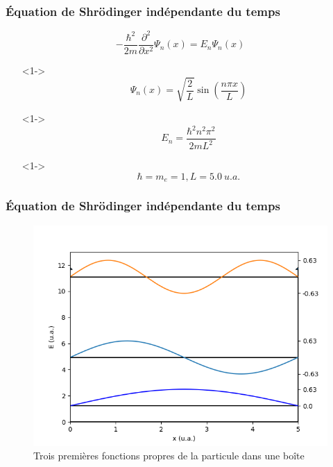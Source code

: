 \documentclass[aspectratio=169]{beamer}
\begin{document}
\begin{frame}
\frametitle{Équation de Shrödinger indépendante du temps}


\begin{equation}\tag{4}
-\frac{\hbar^2}{2m}\frac{\partial^2}{\partial x^2}\Psi_n(x)=E_n\Psi_n(x)
\end{equation} 

\begin{itemize}
\item[]<1-> \begin{equation}\tag{5}
\Psi_n(x)=\sqrt{\frac{2}{L}}\sin(\frac{n\pi x}{L})
\end{equation}  

\item[]<1-> \begin{equation}\tag{8}
E_n=\frac{\hbar^2n^2\pi^2}{2mL^2} 
\end{equation} 
\item[]<1-> \begin{equation}\tag{9}
\hbar=m_e=1 , L=5.0\ u.a. 
\end{equation} 

\end{itemize}

\end{frame}


\begin{frame}
\frametitle{Équation de Shrödinger indépendante du temps}
\begin{figure}[h]
\includegraphics[scale=0.5]{fct_propre}
\caption{Trois premières fonctions propres de la particule dans une boîte}
\end{figure}
\end{frame}
\end{document}
